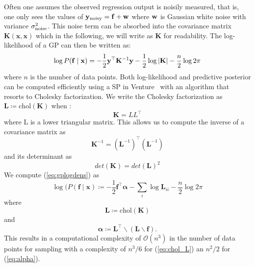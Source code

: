 Often one assumes the observed regression output is noisily measured, that is, one only sees the values of $\mathbf{y}_{\textrm{noisy}} = \mathbf{f}+ \mathbf{w}$ where $\mathbf{w}$ is Gaussian white noise with variance $\sigma_{\textrm{noise}}^2$. This noise term can be absorbed into the covariance matrix $\mathbf{K}(\mathbf{x},\mathbf{x})$ which in the following, we will write as $\mathbf{K}$ for readability. The log-likelihood of a \ac{GP} can then be written as:
\begin{equation}
\label{eq:gplogdens}
\log P(\mathbf{f} \mid \mathbf{x}) =
-\frac12 \mathbf{y}^\top 
\mathbf{K}^{-1} \mathbf{y}
- \frac12\log \left\lvert \mathbf{K} \right\rvert
- \frac{n}{2}\log 2\pi
\end{equation}
where $n$ is the number of data points.
Both log-likelihood and predictive posterior can be computed efficiently using a \ac{SP} in Venture~\citep{mansinghka2014venture}
with an algorithm that resorts to Cholesky factorization\citep[chap. 2]{rasmussen2006gaussian}. 
We write the Cholesky factorization as 
$\mathbf{L} \coloneqq \text{chol}(\mathbf{K})$ when
:
\begin{equation}
\mathbf{K} = LL^\top
\end{equation}
where L is a lower triangular matrix. This allows us to compute the inverse of a covariance matrix as
\begin{equation}
\mathbf{K}^{-1} = (\mathbf{L}^{-1})^\top (\mathbf{L}^{-1})
\end{equation}
and its determinant as 
\begin{equation}
det(\mathbf{K}) = det(\mathbf{L})^2
\end{equation}
We compute (\ref{eq:gplogdens}) as
\begin{equation}
\log(P(\mathbf{f}\mid \mathbf{x})\coloneqq - \frac{1}{2} \mathbf{f}^\top \bm{\alpha} - \sum_i \log \mathbf{L}_{ii} - \frac{n}{2} \log 2 \pi
\end{equation}
where 
\begin{equation}
\label{eq:chol_L}
\mathbf{L} \coloneqq \text{chol}(\mathbf{K})
\end{equation}
and 
\begin{equation}
\label{eq:alpha}
\bm{\alpha} \coloneqq  \mathbf{L}^\top \backslash(\mathbf{L} \backslash \mathbf{f}). 
\end{equation}
This results in a computational complexity of $\mathcal{O}(n^3)$ in the number of data points for
sampling with a complexity of $n^3/6$ for (\ref{eq:chol_L}) an $n^2/2$ for (\ref{eq:alpha}). 



